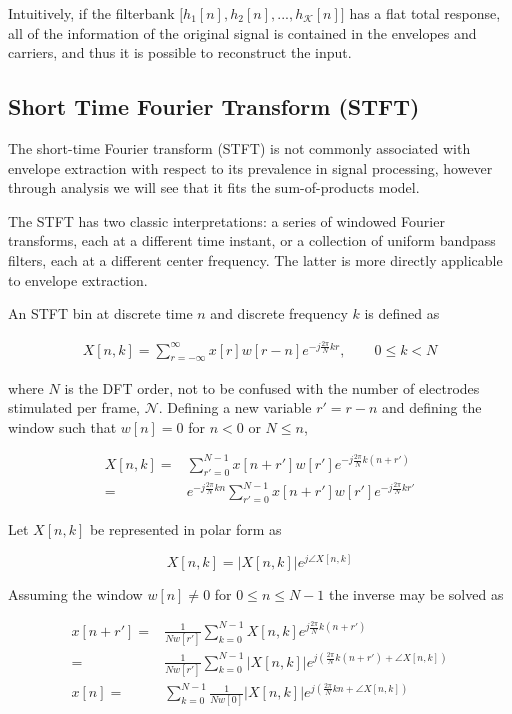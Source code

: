 \documentclass [11pt, proquest,oneside] {ganter_thesis}[2015/03/03]
\begin{document}
Intuitively, if the filterbank $\Big[h_1[n], h_2[n], ...,h_\mathcal{K}[n]\Big]$ has a flat total response, all of the information of the original signal is contained in the envelopes and carriers, and thus it is possible to reconstruct the input.

\subsection{Short Time Fourier Transform (STFT)}

The short-time Fourier transform (STFT) is not commonly associated with envelope extraction with respect to its prevalence in signal processing, however through analysis we will see that it fits the sum-of-products model.

The STFT has two classic interpretations: a series of windowed Fourier transforms, each at a different time instant, or a collection of uniform bandpass filters, each at a different center frequency.  The latter is more directly applicable to envelope extraction.

An STFT bin at discrete time $n$ and discrete frequency $k$ is defined as

\begin{align}
\label{eq:STFTdefinition}
X[n,k] = \sum\limits_{r=-\infty}^{\infty} x[r] w[r - n] e^{-j\frac{2\pi}{N}kr}, \qquad 0 \leq k < N
\end{align}

where $N$ is the DFT order, not to be confused with the number of electrodes stimulated per frame, $\mathcal{N}$.  Defining a new variable $r' = r - n$ and defining the window such that  $w[n] = 0$ for $n < 0$ or $N \leq n$,

\begin{align}
X[n,k] =& \sum\limits_{r'=0}^{N-1} x[n + r'] w[r'] e^{-j\frac{2\pi}{N}k(n + r')} \nonumber \\
=& e^{-j\frac{2\pi}{N}kn} \sum\limits_{r'=0}^{N-1} x[n + r'] w[r'] e^{-j\frac{2\pi}{N}kr'}
\end{align}

Let $X[n,k]$ be represented in polar form as

\begin{equation}
X[n,k] = \vert X[n,k]\vert e^{j\angle X[n,k]}
\end{equation}

Assuming the window $w[n] \neq 0$ for $0 \leq n \leq N-1$ the inverse may be solved as

\begin{align}
\label{eq:hop_factor}
x[n + r'] =& \frac{1}{Nw[r']}  \sum\limits_{k=0}^{N-1} X[n,k] e^{j\frac{2\pi}{N}k(n+r')} \nonumber \\
=& \frac{1}{Nw[r']}  \sum\limits_{k=0}^{N-1} \vert X[n,k]\vert e^{j(\frac{2\pi}{N}k(n+r') + \angle X[n,k])} \\
\label{eq:hop_factor_1}
x[n] =&\sum\limits_{k=0}^{N-1}  \frac{1}{Nw[0]}  \vert X[n,k]\vert e^{j(\frac{2\pi}{N}kn + \angle X[n,k])}
\end{align}
\end{document}
